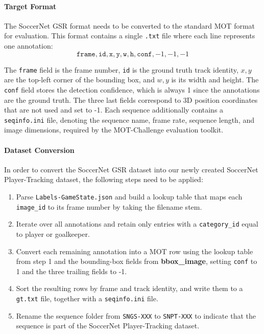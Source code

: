 \paragraph{Target Format}
The SoccerNet GSR format needs to be converted to the standard MOT format for evaluation. This format contains a single \texttt{.txt} file where each line represents one annotation:
\begin{equation*}
    \texttt{frame}, \texttt{id}, \texttt{x}, \texttt{y}, \texttt{w}, \texttt{h}, \texttt{conf}, -1, -1, -1
\end{equation*}

The \texttt{frame} field is the frame number, \texttt{id} is the ground truth track identity, $x,y$ are the top-left corner of the bounding box, and $w,y$ is its width and height. The \texttt{conf} field stores the detection confidence, which is always 1 since the annotations are the ground truth. The three last fields correspond to 3D position coordinates that are not used and set to -1. Each sequence additionally contains a \texttt{seqinfo.ini} file, denoting the sequence name, frame rate, sequence length, and image dimensions, required by the MOT-Challenge evaluation toolkit.   

\paragraph{Dataset Conversion}
In order to convert the SoccerNet GSR dataset into our newly created SoccerNet Player-Tracking dataset, the following steps need to be applied:

\begin{enumerate}
    \item Parse \texttt{Labels-GameState.json} and build a lookup table that maps each  \texttt{image\_id} to its frame number by taking the filename stem.

    \item Iterate over all annotations  and retain only entries with a \texttt{category\_id} equal to player or goalkeeper. 

    \item Convert each remaining annotation into a MOT row using the lookup table from step 1 and the bounding-box fields from \textbf{bbox\_image}, setting \texttt{conf} to 1 and the three trailing fields to -1.

    \item Sort the resulting  rows by frame and track identity, and write them to a \texttt{gt.txt} file, together with a \texttt{seqinfo.ini} file.

    \item Rename the sequence folder from \texttt{SNGS-XXX} to \texttt{SNPT-XXX} to indicate that the sequence is part of the SoccerNet Player-Tracking dataset.
\end{enumerate}

